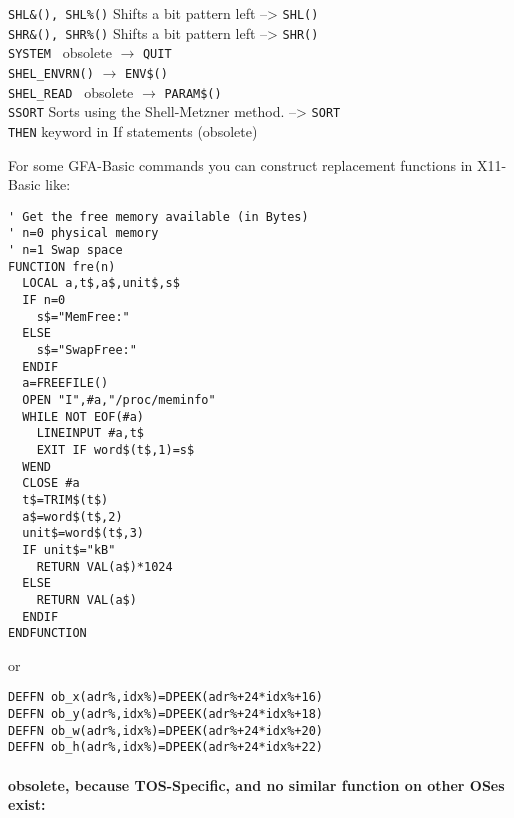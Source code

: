 \begin{tabbing}
\verb|SHL&(), SHL%()|\>  Shifts a bit pattern left --> \verb|SHL()|\\
\verb|SHR&(), SHR%()|\>  Shifts a bit pattern left --> \verb|SHR()|\\
\verb|SYSTEM |\> 	obsolete  $\longrightarrow$ \verb|QUIT|\\
\verb|SHEL_ENVRN()|\>	$\longrightarrow$ \verb|ENV$()|\\
\verb|SHEL_READ |\> 	obsolete  $\longrightarrow$ \verb|PARAM$()|\\
\verb|SSORT|\>        Sorts using the Shell-Metzner method. --> \verb|SORT|\\
\verb|THEN|\>           keyword in If statements (obsolete)\\
\end{tabbing}

For some GFA-Basic commands you can construct replacement functions in 
X11-Basic like:
{\linespread{0.8}\footnotesize \begin{verbatim}
' Get the free memory available (in Bytes)
' n=0 physical memory
' n=1 Swap space
FUNCTION fre(n)
  LOCAL a,t$,a$,unit$,s$
  IF n=0
    s$="MemFree:"
  ELSE 
    s$="SwapFree:"
  ENDIF
  a=FREEFILE()
  OPEN "I",#a,"/proc/meminfo"
  WHILE NOT EOF(#a)
    LINEINPUT #a,t$
    EXIT IF word$(t$,1)=s$
  WEND
  CLOSE #a
  t$=TRIM$(t$)
  a$=word$(t$,2)
  unit$=word$(t$,3)
  IF unit$="kB"
    RETURN VAL(a$)*1024
  ELSE
    RETURN VAL(a$)
  ENDIF
ENDFUNCTION
\end{verbatim}}
or 
{\linespread{0.8}\footnotesize \begin{verbatim}
DEFFN ob_x(adr%,idx%)=DPEEK(adr%+24*idx%+16)
DEFFN ob_y(adr%,idx%)=DPEEK(adr%+24*idx%+18)
DEFFN ob_w(adr%,idx%)=DPEEK(adr%+24*idx%+20)
DEFFN ob_h(adr%,idx%)=DPEEK(adr%+24*idx%+22)
\end{verbatim}}

\paragraph{obsolete, because TOS-Specific, and no similar function on other OSes exist:}


